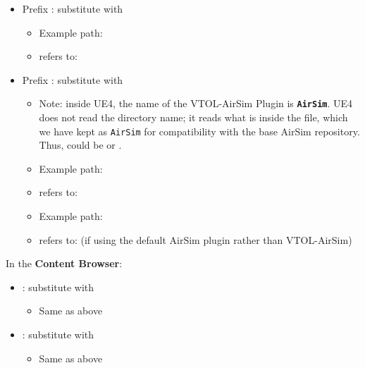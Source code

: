 \begin{itemize}
    \item Prefix : substitute with 
    \begin{itemize}
        \item Example path: 
        \item refers to: 
    \end{itemize}
    \item Prefix : substitute with 
    \begin{itemize}
        \item Note: inside UE4, the name of the VTOL-AirSim Plugin is \textbf{\texttt{AirSim}}. UE4 does not read the directory name; it reads what is inside the  file, which we have kept as \texttt{AirSim} for compatibility with the base AirSim repository. Thus,  could be  or .
        \item Example path: 
        \item refers to: 
        \item Example path: 
        \item refers to:  (if using the default AirSim plugin rather than VTOL-AirSim)
    \end{itemize}
\end{itemize}

In the \textbf{Content Browser}:

\begin{itemize}
    \item {}: substitute with 
    \begin{itemize}
        \item Same as  above
    \end{itemize}
    \item {}: substitute with 
    \begin{itemize}
        \item Same as  above
    \end{itemize}
\end{itemize}
